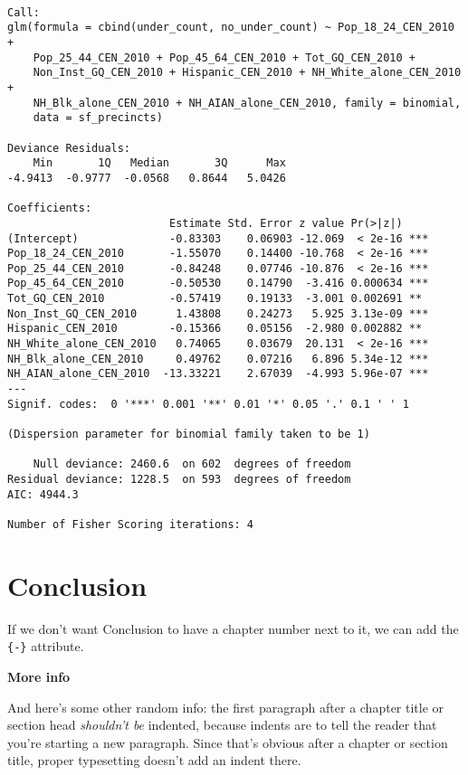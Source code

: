 \documentclass[12pt,twoside]{reedthesis}
\theoremstyle{definition}
\theoremstyle{definition}
\theoremstyle{definition}
\theoremstyle{remark}
\begin{document}
\begin{verbatim}

Call:
glm(formula = cbind(under_count, no_under_count) ~ Pop_18_24_CEN_2010 + 
    Pop_25_44_CEN_2010 + Pop_45_64_CEN_2010 + Tot_GQ_CEN_2010 + 
    Non_Inst_GQ_CEN_2010 + Hispanic_CEN_2010 + NH_White_alone_CEN_2010 + 
    NH_Blk_alone_CEN_2010 + NH_AIAN_alone_CEN_2010, family = binomial, 
    data = sf_precincts)

Deviance Residuals: 
    Min       1Q   Median       3Q      Max  
-4.9413  -0.9777  -0.0568   0.8644   5.0426  

Coefficients:
                         Estimate Std. Error z value Pr(>|z|)    
(Intercept)              -0.83303    0.06903 -12.069  < 2e-16 ***
Pop_18_24_CEN_2010       -1.55070    0.14400 -10.768  < 2e-16 ***
Pop_25_44_CEN_2010       -0.84248    0.07746 -10.876  < 2e-16 ***
Pop_45_64_CEN_2010       -0.50530    0.14790  -3.416 0.000634 ***
Tot_GQ_CEN_2010          -0.57419    0.19133  -3.001 0.002691 ** 
Non_Inst_GQ_CEN_2010      1.43808    0.24273   5.925 3.13e-09 ***
Hispanic_CEN_2010        -0.15366    0.05156  -2.980 0.002882 ** 
NH_White_alone_CEN_2010   0.74065    0.03679  20.131  < 2e-16 ***
NH_Blk_alone_CEN_2010     0.49762    0.07216   6.896 5.34e-12 ***
NH_AIAN_alone_CEN_2010  -13.33221    2.67039  -4.993 5.96e-07 ***
---
Signif. codes:  0 '***' 0.001 '**' 0.01 '*' 0.05 '.' 0.1 ' ' 1

(Dispersion parameter for binomial family taken to be 1)

    Null deviance: 2460.6  on 602  degrees of freedom
Residual deviance: 1228.5  on 593  degrees of freedom
AIC: 4944.3

Number of Fisher Scoring iterations: 4
\end{verbatim}
\hypertarget{conclusion}{%
\chapter*{Conclusion}\label{conclusion}}

If we don't want Conclusion to have a chapter number next to it, we can
add the \texttt{\{-\}} attribute.

\textbf{More info}

And here's some other random info: the first paragraph after a chapter
title or section head \emph{shouldn't be} indented, because indents are
to tell the reader that you're starting a new paragraph. Since that's
obvious after a chapter or section title, proper typesetting doesn't add
an indent there.
\end{document}

